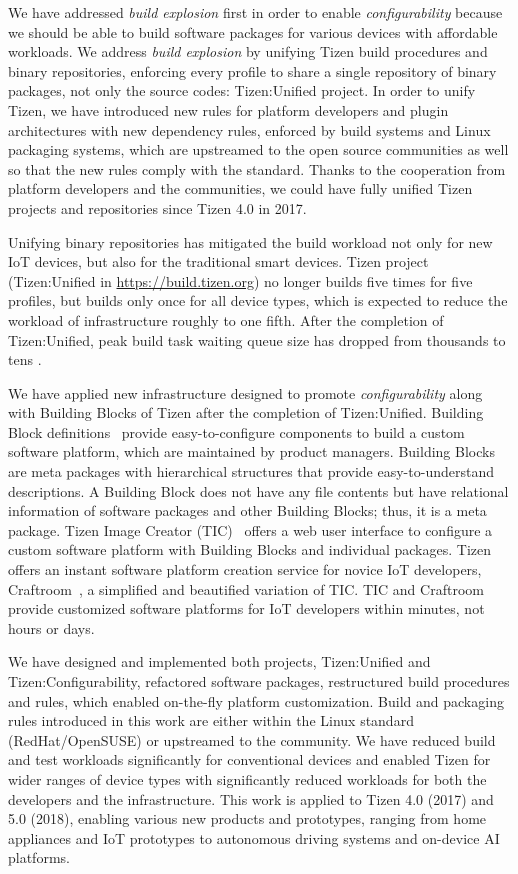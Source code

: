 We have addressed \textit{build explosion} first in order to enable \textit{configurability} because we should be able to build software packages for various devices with affordable workloads.
We address \textit{build explosion} by unifying Tizen build procedures and binary repositories, enforcing every profile to share a single repository of binary packages, not only the source codes: Tizen:Unified project.
In order to unify Tizen, we have introduced new rules for platform developers and plugin architectures with new dependency rules, enforced by build systems and Linux packaging systems, which are upstreamed to the open source communities as well so that the new rules comply with the standard.
Thanks to the cooperation from platform developers and the communities, we could have fully unified Tizen projects and repositories since Tizen 4.0 in 2017.


Unifying binary repositories has mitigated the build workload not only for new IoT devices, but also for the traditional smart devices.
Tizen project (Tizen:Unified in \url{https://build.tizen.org}) no longer builds five times for five profiles, but builds only once for all device types, which is expected to reduce the workload of infrastructure roughly to one fifth.
After the completion of Tizen:Unified, peak build task waiting queue size has dropped from thousands to tens \cite{2Ham2017TDC}.


We have applied new infrastructure designed to promote \textit{configurability} along with Building Blocks of Tizen after the completion of Tizen:Unified.
Building Block definitions~\cite{3TizenWikiBB,4LeeKeynote2017TDC} provide easy-to-configure components to build a custom software platform, which are maintained by product managers.
Building Blocks are meta packages with hierarchical structures that provide easy-to-understand descriptions.
A Building Block does not have any file contents but have relational information of software packages and other Building Blocks; thus, it is a meta package.
Tizen Image Creator (TIC)~\cite{2Ham2017TDC} offers a web user interface to configure a custom software platform with Building Blocks and individual packages.
Tizen offers an instant software platform creation service for novice IoT developers, Craftroom~\cite{5CraftroomURL}, a simplified and beautified variation of TIC.
TIC and Craftroom provide customized software platforms for IoT developers within minutes, not hours or days.

We have designed and implemented both projects, Tizen:Unified and Tizen:Configurability, refactored software packages, restructured build procedures and rules, which enabled on-the-fly platform customization.
Build and packaging rules introduced in this work are either within the Linux standard (RedHat/OpenSUSE) or upstreamed to the community.
We have reduced build and test workloads significantly for conventional devices and enabled Tizen for wider ranges of device types with significantly reduced workloads for both the developers and the infrastructure.
This work is applied to Tizen 4.0 (2017) and 5.0 (2018), enabling various new products and prototypes, ranging from home appliances and IoT prototypes to autonomous driving systems and on-device AI platforms.